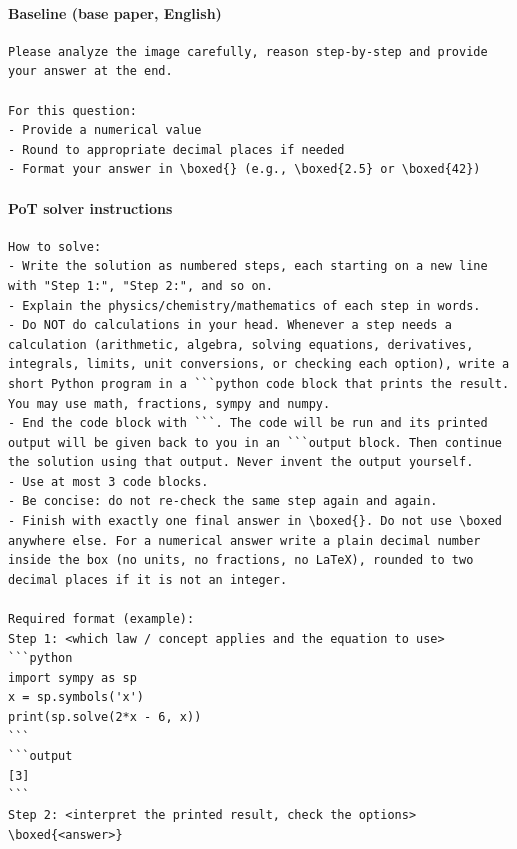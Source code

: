 \paragraph{Baseline (base paper, English)}
\begin{small}\begin{verbatim}
Please analyze the image carefully, reason step-by-step and provide
your answer at the end.

For this question:
- Provide a numerical value
- Round to appropriate decimal places if needed
- Format your answer in \boxed{} (e.g., \boxed{2.5} or \boxed{42})
\end{verbatim}\end{small}

\paragraph{PoT solver instructions}
\begin{small}\begin{verbatim}
How to solve:
- Write the solution as numbered steps, each starting on a new line
with "Step 1:", "Step 2:", and so on.
- Explain the physics/chemistry/mathematics of each step in words.
- Do NOT do calculations in your head. Whenever a step needs a
calculation (arithmetic, algebra, solving equations, derivatives,
integrals, limits, unit conversions, or checking each option), write a
short Python program in a ```python code block that prints the result.
You may use math, fractions, sympy and numpy.
- End the code block with ```. The code will be run and its printed
output will be given back to you in an ```output block. Then continue
the solution using that output. Never invent the output yourself.
- Use at most 3 code blocks.
- Be concise: do not re-check the same step again and again.
- Finish with exactly one final answer in \boxed{}. Do not use \boxed
anywhere else. For a numerical answer write a plain decimal number
inside the box (no units, no fractions, no LaTeX), rounded to two
decimal places if it is not an integer.

Required format (example):
Step 1: <which law / concept applies and the equation to use>
```python
import sympy as sp
x = sp.symbols('x')
print(sp.solve(2*x - 6, x))
```
```output
[3]
```
Step 2: <interpret the printed result, check the options>
\boxed{<answer>}
\end{verbatim}\end{small}

